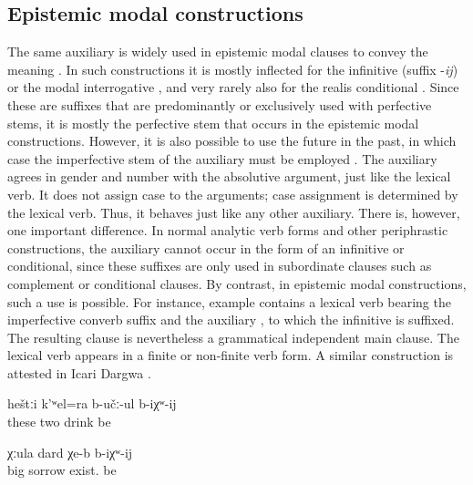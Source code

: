 \subsection{Epistemic modal constructions}
\label{ssec:Epistemic modal constructions}

The same auxiliary is widely used in epistemic modal clauses to convey the meaning . In such constructions it is mostly inflected for the infinitive (suffix -\textit{ij})  or the modal interrogative  , and very rarely also for the realis conditional  . Since these are suffixes that are predominantly or exclusively used with perfective stems, it is mostly the perfective stem  that occurs in the epistemic modal constructions. However, it is also possible to use the future in the past, in which case the imperfective stem of the auxiliary must be employed . The auxiliary agrees in gender and number with the absolutive argument, just like the lexical verb. It does not assign case to the arguments; case assignment is determined by the lexical verb. Thus, it behaves just like any other auxiliary. There is, however, one important difference. In normal analytic verb forms and other periphrastic constructions, the auxiliary cannot occur in the form of an infinitive or conditional, since these suffixes are only used in subordinate clauses such as complement or conditional clauses. By contrast, in epistemic modal constructions, such a use is possible. For instance, example  contains a lexical verb bearing the imperfective converb suffix and the auxiliary , to which the infinitive is suffixed. The resulting clause is nevertheless a grammatical independent main clause. The lexical verb appears in a finite or non-finite verb form. A similar construction is attested in Icari Dargwa \citep[110]{Sumbatova.Mutalov2003}.
%
\begin{exe}
	\ex	\label{ex:These two are probably drinking}
	\gll	heštːi	k'ʷel=ra	b-učː-ul	b-iχʷ-ij\\
		these	two	drink	be\\
	\glt	{}

	\ex	\label{ex:(He) probably has big sorrows}
	\gll	χːula	dard	χe-b	b-iχʷ-ij\\
		big	sorrow	exist.		be\\
	\glt	{}
\end{exe}

